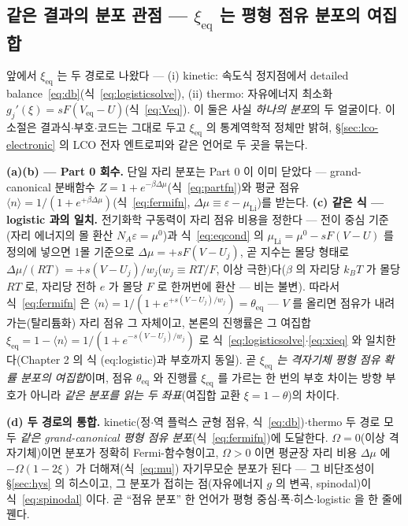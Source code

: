 \documentclass[11pt,a4paper]{article}
\newcommand{\eq}{\mathrm{eq}}
\begin{document}
\subsection{같은 결과의 분포 관점 — $\xi_\eq$ 는 평형 점유 분포의 여집합}\label{sec:dist}
앞에서 $\xi_\eq$ 는 두 경로로 나왔다 — (i) kinetic: 속도식 정지점에서 detailed balance~\eqref{eq:db}(식~\eqref{eq:logisticsolve}),
(ii) thermo: 자유에너지 최소화 $g_j'(\xi)=sF(V_\eq-U)$(식~\eqref{eq:Veq}). 이 둘은 사실 \emph{하나의 분포}의 두 얼굴이다.
이 소절은 결과식$\cdot$부호$\cdot$코드는 그대로 두고 $\xi_\eq$ 의 통계역학적 정체만 밝혀,
\S\ref{sec:lco-electronic} 의 LCO 전자 엔트로피와 같은 언어로 두 곳을 묶는다.

\textbf{(a)(b) --- Part 0 회수.} 단일 자리 분포는 Part 0 이 이미 닫았다 --- grand-canonical
분배함수 $Z=1+e^{-\beta\Delta\mu}$(식~\eqref{eq:partfn})와 평균 점유
$\langle n\rangle=1/(1+e^{+\beta\Delta\mu})$(식~\eqref{eq:fermifn},
$\Delta\mu\equiv\varepsilon-\mu_\mathrm{Li}$)를 받는다. \textbf{(c) 같은 식 --- logistic 과의 일치.}
전기화학 구동력이 자리 점유 비용을 정한다 --- 전이 중심 기준(자리 에너지의 몰 환산 $N_A\varepsilon=\mu^0$)과
식~\eqref{eq:eqcond} 의 $\mu_\mathrm{Li}=\mu^0-sF(V-U)$ 를 정의에 넣으면 1몰 기준으로
$\Delta\mu=+sF(V-U_j)$, 곧 지수는 몰당 형태로
$\Delta\mu/(RT)=+s(V-U_j)/w_j$($w_j\equiv RT/F$, 이상 극한)다($\beta$ 의 자리당 $k_BT$ 가 몰당 $RT$ 로,
자리당 전하 $e$ 가 몰당 $F$ 로 한꺼번에 환산 --- 비는 불변). 따라서 식~\eqref{eq:fermifn} 은
$\langle n\rangle=1/(1+e^{+s(V-U_j)/w_j})=\theta_\eq$ --- $V$ 를 올리면 점유가 내려가는(탈리튬화) 자리 점유
그 자체이고, 본론의 진행률은 그 여집합 $\xi_\eq=1-\langle n\rangle=1/(1+e^{-s(V-U_j)/w_j})$ 로
식~\eqref{eq:logisticsolve}$\cdot$\eqref{eq:xieq} 와 일치한다(Chapter 2 의 식 (eq:logistic)과 부호까지 동일).
곧 \emph{$\xi_\eq$ 는 격자기체 평형 점유 확률 분포의 여집합}이며, 점유 $\theta_\eq$ 와 진행률 $\xi_\eq$ 를
가르는 한 번의 부호 차이는 방향 부호가 아니라 \emph{같은 분포를 읽는 두 좌표}(여집합 교환
$\xi=1-\theta$)의 차이다.

\textbf{(d) 두 경로의 통합.} kinetic(정$\cdot$역 플럭스 균형 점유, 식~\eqref{eq:db})$\cdot$thermo 두 경로
모두 \emph{같은 grand-canonical 평형 점유 분포}(식~\eqref{eq:fermifn})에 도달한다. $\Omega=0$(이상 격자기체)이면 분포가 정확히 Fermi-함수형이고, $\Omega>0$
이면 평균장 자리 비용 $\Delta\mu$ 에 $-\Omega(1-2\xi)$ 가 더해져(식~\eqref{eq:mu}) 자기무모순 분포가 된다 — 그
비단조성이 \S\ref{sec:hys} 의 히스이고, 그 분포가 접히는 점(자유에너지 $g$ 의 변곡, spinodal)이 식~\eqref{eq:spinodal} 이다. 곧 ``점유 분포''
한 언어가 평형 중심$\cdot$폭$\cdot$히스$\cdot$logistic 을 한 줄에 꿴다.
\end{document}
